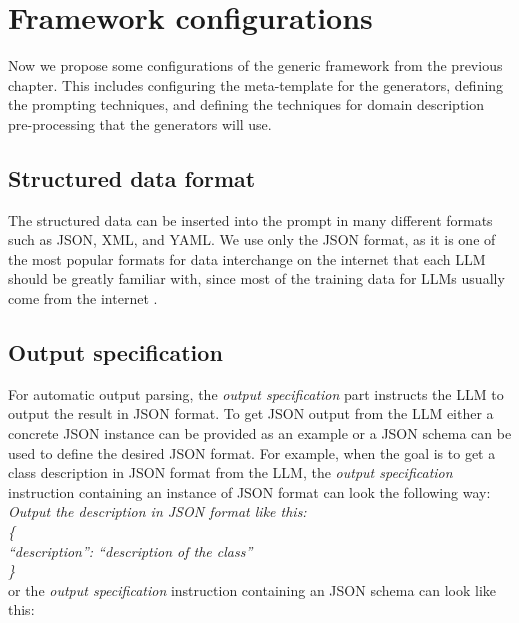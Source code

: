 \chapter{Framework configurations}
\label{chap:framework_configuration}

Now we propose some configurations of the generic framework from the previous chapter. This includes configuring the meta-template for the generators, defining the prompting techniques, and defining the techniques for domain description pre-processing that the generators will use.


\section{Structured data format}

The structured data can be inserted into the prompt in many different formats such as JSON, XML, and YAML. We use only the JSON format, as it is one of the most popular formats for data interchange on the internet that each LLM should be greatly familiar with, since most of the training data for LLMs usually come from the internet \cite{Zhao2023}.


\section{Output specification}

For automatic output parsing, the \emph{output specification} part instructs the LLM to output the result in JSON format. To get JSON output from the LLM either a concrete JSON instance can be provided as an example or a JSON schema can be used to define the desired JSON format. For example, when the goal is to get a class description in JSON format from the LLM, the \emph{output specification} instruction containing an instance of JSON format can look the following way: \\

\noindent{}\textit{Output the description in JSON format like this: \\
\{ \\
\null \quad ``description'': ``description of the class'' \\
\}} \\

\noindent{}or the \emph{output specification} instruction containing an JSON schema can look like this: \\


